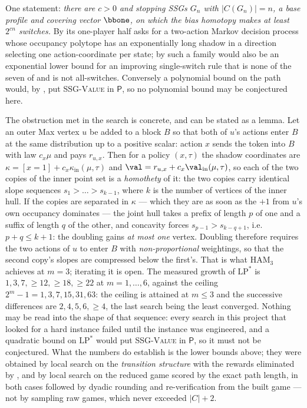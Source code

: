 \begin{remark}\label{fsa:gap}
One statement: \emph{there are $c>0$ and stopping SSGs $G_n$ with
$|C(G_n)|=n$, a base profile and covering vector $\bbone$, on which the bias
homotopy makes at least $2^{cn}$ switches.} By  its
one-player half asks for a two-action Markov decision process whose occupancy
polytope has an exponentially long shadow in a direction selecting one
action-coordinate per state; by  such a family would
also be an exponential lower bound for an improving single-switch rule that is
none of the seven of  and is not all-switches.
Conversely a polynomial bound on the path would, by
, put \textsc{SSG-Value} in $\mathsf P$, so no
polynomial bound may be conjectured here.

The obstruction met in the search is concrete, and can be stated as a lemma.
Let an outer Max vertex $u$ be added to a block $B$ so that both of $u$'s
actions enter $B$ at the same distribution up to a positive scalar: action $x$
sends the token into $B$ with law $c_x\mu$ and pays $r_{u,x}$. Then for a
policy $(x,\tau)$ the shadow coordinates are
$\kappa=[x{=}1]+c_x\kappa_{\mathrm{in}}(\mu,\tau)$ and
$\val=r_{u,x}+c_x\val_{\mathrm{in}}(\mu,\tau)$, so each of the two copies of
the inner point set is a \emph{homothety} of it: the two copies carry
identical slope sequences $s_1>\dots>s_{k-1}$, where $k$ is the number of
vertices of the inner hull. If the copies are separated in $\kappa$ --- which
they are as soon as the $+1$ from $u$'s own occupancy dominates --- the joint
hull takes a prefix of length $p$ of one and a suffix of length $q$ of the
other, and concavity forces $s_{p-1}>s_{k-q+1}$, i.e.\ $p+q\le k+1$: the
doubling gains \emph{at most one} vertex. Doubling therefore requires the two
actions of $u$ to enter $B$ with \emph{non-proportional} weightings, so that
the second copy's slopes are compressed below the first's. That is what
$\mathrm{HAM}_3$ achieves at $m=3$; iterating it is open.
The measured growth of $\mathrm{LP}^{\ast}$ is
$1,3,7,\ge12,\ge18,\ge22$ at $m=1,\dots,6$, against the ceiling
$2^{m}-1=1,3,7,15,31,63$: the ceiling is attained at $m\le3$ and the
successive differences are $2,4,5,6,\ge4$, the last search being the least
converged. Nothing may be read into the shape of that sequence:
every search in this project that looked for a hard instance failed until the
instance was engineered, and a quadratic bound on $\mathrm{LP}^{\ast}$ would
put \textsc{SSG-Value} in $\mathsf P$, so it must not be conjectured. What the
numbers do establish is the lower bounds above; they were obtained by local
search on the \emph{transition structure} with the rewards eliminated by
, and by local search on the reduced game scored by the
exact path length, in both cases followed by dyadic rounding and
re-verification from the built game --- not by sampling raw games, which never
exceeded $|C|+2$.
\end{remark}

